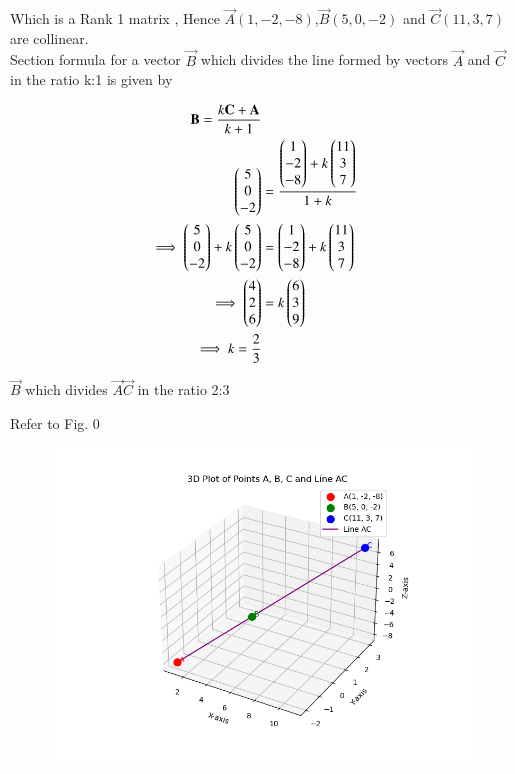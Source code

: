 \documentclass[journal]{IEEEtran}
\begin{document}
Which is a Rank 1 matrix , Hence   $\vec{A}(1,-2,-8)$,$\vec{B}(5,0,-2)$ and $\vec{C}(11,3,7)$ are collinear.\\

Section formula for a vector $\vec{B}$ which divides the line formed by vectors $\vec{A}$ and $\vec{C}$ in the ratio k:1 is given by

\begin{align}
    \mathbf{B}=\frac{k\mathbf{C}+\mathbf{A}}{k+1}\\
             \begin{pmatrix}5\\0\\-2\end{pmatrix} &=\frac{{\begin{pmatrix}1\\-2\\-8\end{pmatrix}+k\begin{pmatrix}11\\3\\7\end{pmatrix}}}{1+k}\\
    \implies\begin{pmatrix}5\\0\\-2\end{pmatrix} + k\begin{pmatrix}5\\0\\-2\end{pmatrix} &=\begin{pmatrix}1\\-2\\-8\end{pmatrix}+k\begin{pmatrix}11\\3\\7\end{pmatrix}\\ 
    \implies \begin{pmatrix}4 \\2 \\6\end{pmatrix} &= k\begin{pmatrix}6 \\ 3 \\9\end{pmatrix}\\
    \implies k = \frac{2}{3}
\end{align}

 $\vec{B}$ which divides  $\vec{A}\vec{C}$ in the ratio 2:3


Refer to Fig. 0

\begin{figure}[H]
\begin{center}
\includegraphics[width=0.6\columnwidth]{figs/Fig.png}
\end{center}
\caption{}
\label{fig:Fig}
\end{figure}
\end{document}
